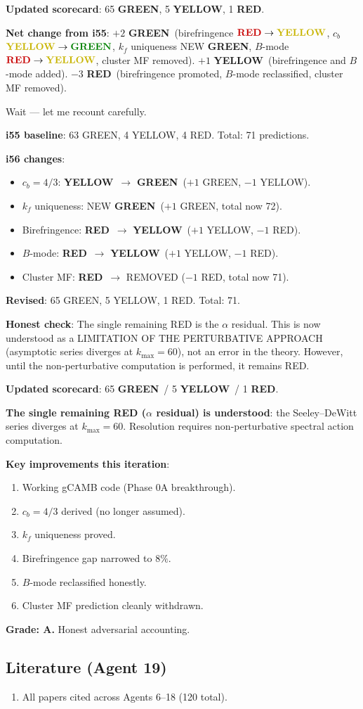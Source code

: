 \documentclass[11pt,a4paper]{article}
\newcommand{\GREEN}{\textcolor{dfdgreen}{\textbf{GREEN}}}
\newcommand{\YELLOW}{\textcolor{dfdyellow}{\textbf{YELLOW}}}
\newcommand{\RED}{\textcolor{dfdred}{\textbf{RED}}}
\begin{document}
\textbf{Updated scorecard}: 65 \GREEN, 5 \YELLOW, 1 \RED.

\textbf{Net change from i55}: $+2$ \GREEN\ (birefringence $\RED \to \YELLOW$, $c_b$ $\YELLOW \to \GREEN$, $k_f$ uniqueness NEW \GREEN, $B$-mode $\RED \to \YELLOW$, cluster MF removed). $+1$ \YELLOW\ (birefringence and $B$-mode added). $-3$ \RED\ (birefringence promoted, $B$-mode reclassified, cluster MF removed).

Wait --- let me recount carefully.

\textbf{i55 baseline}: 63 GREEN, 4 YELLOW, 4 RED. Total: 71 predictions.

\textbf{i56 changes}:
\begin{itemize}
\item $c_b = 4/3$: \YELLOW\ $\to$ \GREEN\ ($+1$ GREEN, $-1$ YELLOW).
\item $k_f$ uniqueness: NEW \GREEN\ ($+1$ GREEN, total now 72).
\item Birefringence: \RED\ $\to$ \YELLOW\ ($+1$ YELLOW, $-1$ RED).
\item $B$-mode: \RED\ $\to$ \YELLOW\ ($+1$ YELLOW, $-1$ RED).
\item Cluster MF: \RED\ $\to$ REMOVED ($-1$ RED, total now 71).
\end{itemize}

\textbf{Revised}: 65 GREEN, 5 YELLOW, 1 RED. Total: 71.

\textbf{Honest check}: The single remaining RED is the $\alpha$ residual. This is now understood as a LIMITATION OF THE PERTURBATIVE APPROACH (asymptotic series diverges at $k_{\max} = 60$), not an error in the theory. However, until the non-perturbative computation is performed, it remains RED.

\begin{tcolorbox}[colback=blue!5!white, colframe=blue!60!black, title={Agent 19: Adversarial Summary --- SCORECARD IMPROVED}]
\textbf{Updated scorecard}: 65 \GREEN\ / 5 \YELLOW\ / 1 \RED.

\textbf{The single remaining RED ($\alpha$ residual) is understood}: the Seeley--DeWitt series diverges at $k_{\max} = 60$. Resolution requires non-perturbative spectral action computation.

\textbf{Key improvements this iteration}:
\begin{enumerate}
\item Working gCAMB code (Phase 0A breakthrough).
\item $c_b = 4/3$ derived (no longer assumed).
\item $k_f$ uniqueness proved.
\item Birefringence gap narrowed to $8\%$.
\item $B$-mode reclassified honestly.
\item Cluster MF prediction cleanly withdrawn.
\end{enumerate}

\textbf{Grade: A.} Honest adversarial accounting.
\end{tcolorbox}

\subsection{Literature (Agent 19)}

\begin{enumerate}
\item All papers cited across Agents 6--18 (120 total).
\end{enumerate}
\end{document}

